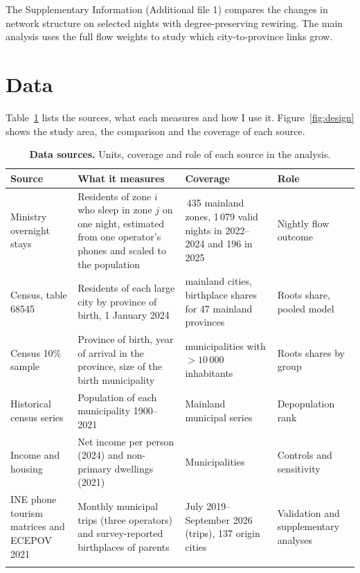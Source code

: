 \documentclass[pdflatex,sn-mathphys-num,referee]{sn-jnl}
\begin{document}
The Supplementary Information (Additional file 1) compares the changes in network structure on selected nights with degree-preserving rewiring. The main analysis uses the full flow weights to study which city-to-province links grow.

\section{Data}\label{sec:data}

Table~\ref{tab:data} lists the sources, what each measures and how I use it. Figure~\ref{fig:design} shows the study area, the comparison and the coverage of each source.

\begin{table}[!htbp]
\caption{\textbf{Data sources.} Units, coverage and role of each source in the analysis.}\label{tab:data}
\footnotesize
\begin{tabularx}{\textwidth}{@{}>{\raggedright\arraybackslash}p{3.4cm}>{\raggedright\arraybackslash}X>{\raggedright\arraybackslash}p{3.35cm}>{\raggedright\arraybackslash}p{2.6cm}@{}}
\toprule
Source & What it measures & Coverage & Role \\
\midrule
Ministry overnight stays \cite{mitms2024methodology,mitmaovernightfiles} & Residents of zone $i$ who sleep in zone $j$ on one night, estimated from one operator's phones and scaled to the population & 2\,435 mainland zones, 1\,079 valid nights in 2022--2024 and 196 in 2025 & Nightly flow outcome \\ \addlinespace[4pt]
Census, table 68545 \cite{ine2026table68545} & Residents of each large city by province of birth, 1 January 2024 & 137 mainland cities, birthplace shares for 47 mainland provinces & Roots share, pooled model \\ \addlinespace[4pt]
Census 10\% sample \cite{ine2025censo} & Province of birth, year of arrival in the province, size of the birth municipality & 675 municipalities with $>10\,000$ inhabitants & Roots shares by group \\ \addlinespace[4pt]
Historical census series \cite{ine2026intercensal} & Population of each municipality 1900--2021 & Mainland municipal series & Depopulation rank \\ \addlinespace[4pt]
Income \cite{ine2026adrh} and housing \cite{ine2023viviendas} & Net income per person (2024) and non-primary dwellings (2021) & Municipalities & Controls and sensitivity \\ \addlinespace[4pt]
INE phone tourism matrices \cite{ine2026turismomoviles,gonzalezolmos2024measuring} and ECEPOV 2021 \cite{ine2023ecepovmicro} & Monthly municipal trips (three operators) and survey-reported birthplaces of parents & July 2019--September 2026 (trips), 137 origin cities & Validation and supplementary analyses \\
\botrule
\end{tabularx}
\end{table}
\end{document}
